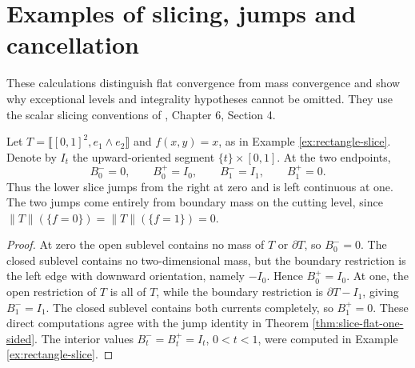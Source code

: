 \chapter{Examples of slicing, jumps and cancellation}\label{sec:examples-current-slice-limits}
These calculations distinguish flat convergence from mass convergence and show why exceptional levels and integrality hypotheses cannot be omitted. They use the scalar slicing conventions of \cite{Sim18}, Chapter 6, Section 4.

\begin{example}\label{ex:rectangle-slice-endpoints}
Let $T=\llbracket[0,1]^2,e_1\wedge e_2\rrbracket$ and $f(x,y)=x$, as in Example \ref{ex:rectangle-slice}. Denote by $I_t$ the upward-oriented segment $\{t\}\times[0,1]$. At the two endpoints,
\[
 B_0^-=0,\qquad B_0^+=I_0,\qquad
 B_1^-=I_1,\qquad B_1^+=0.
\]
Thus the lower slice jumps from the right at zero and is left continuous at one. The two jumps come entirely from boundary mass on the cutting level, since $\|T\|(\{f=0\})=\|T\|(\{f=1\})=0$.
\end{example}
\begin{proof}
At zero the open sublevel contains no mass of $T$ or $\partial T$, so $B_0^-=0$. The closed sublevel contains no two-dimensional mass, but the boundary restriction is the left edge with downward orientation, namely $-I_0$. Hence $B_0^+=I_0$. At one, the open restriction of $T$ is all of $T$, while the boundary restriction is $\partial T-I_1$, giving $B_1^-=I_1$. The closed sublevel contains both currents completely, so $B_1^+=0$. These direct computations agree with the jump identity in Theorem \ref{thm:slice-flat-one-sided}. The interior values $B_t^-=B_t^+=I_t$, $0<t<1$, were computed in Example \ref{ex:rectangle-slice}.
\end{proof}


